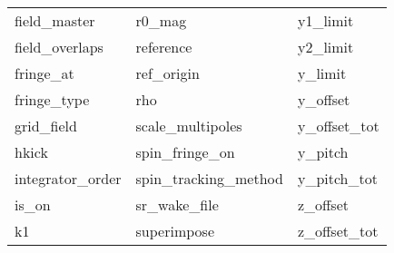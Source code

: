 \begin{tabular}{lll}
field_master                & r0_mag                      & y1_limit                    \\
field_overlaps              & reference                   & y2_limit                    \\
fringe_at                   & ref_origin                  & y_limit                     \\
fringe_type                 & rho                         & y_offset                    \\
grid_field                  & scale_multipoles            & y_offset_tot                \\
hkick                       & spin_fringe_on              & y_pitch                     \\
integrator_order            & spin_tracking_method        & y_pitch_tot                 \\
is_on                       & sr_wake_file                & z_offset                    \\
k1                          & superimpose                 & z_offset_tot                \\
 \bottomrule
 \end{tabular}
 \vfill
 
